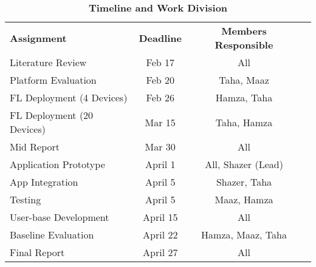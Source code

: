 \begin{table}
    \footnotesize
    \centering
    \begin{tabular}{lccc}
        \textbf{Assignment} & \textbf{Deadline}  & \textbf{Members Responsible}\\
        
        Literature Review                       & Feb 17          & All                     \\
        Platform Evaluation                     & Feb 20          & Taha, Maaz            \\
        FL Deployment (4 Devices)      & Feb 26          & Hamza, Taha             \\
        FL Deployment (20 Devices)     & Mar 15          & Taha, Hamza             \\
        Mid Report                              & Mar 30          & All                     \\
        Application Prototype                   & April 1         & All, Shazer (Lead)            \\
        App Integration                             & April 5         & Shazer, Taha        \\
        Testing                                 & April 5         & Maaz, Hamza         \\
        User-base Development                   & April 15        & All                 \\
        Baseline Evaluation                     & April 22        & Hamza, Maaz, Taha   \\
        Final Report                            & April 27        & All \\
    \end{tabular}

    \caption{
        {\bf Timeline and Work Division}
    }
\end{table}